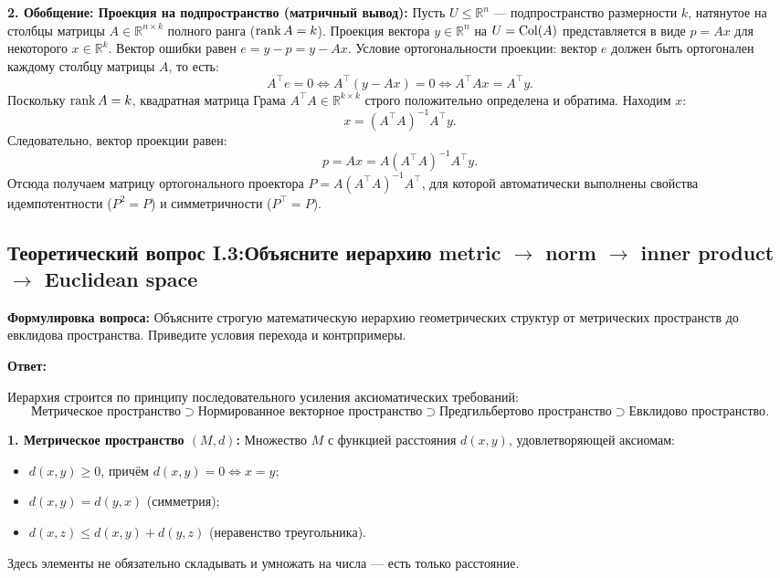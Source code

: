 \textbf{2.
Обобщение: Проекция на подпространство (матричный вывод):} Пусть $U \le \mathbb{R}^n$ — подпространство размерности $k$,
натянутое на столбцы матрицы $A \in \mathbb{R}^{n \times k}$ полного ранга ($\operatorname{rank} A = k$).
Проекция вектора $y \in \mathbb{R}^n$ на $U = \operatorname{Col}(A)$ представляется в виде $p = A x$ для некоторого $x \in
\mathbb{R}^k$.
Вектор ошибки равен $e = y - p = y - A x$.
Условие ортогональности проекции: вектор $e$ должен быть ортогонален каждому столбцу матрицы $A$, то есть:
\[ A^\top e = 0 \iff A^\top (y - A x) = 0 \iff A^\top A x = A^\top y. \]
Поскольку $\operatorname{rank} A = k$, квадратная матрица Грама $A^\top A \in \mathbb{R}^{k \times k}$ строго положительно определена
и обратима.
Находим $x$:
\[ x = (A^\top A)^{-1} A^\top y. \]
Следовательно, вектор проекции равен:
\[ p = A x = A (A^\top A)^{-1} A^\top y. \]
Отсюда получаем матрицу ортогонального проектора $P = A (A^\top A)^{-1} A^\top$, для которой автоматически выполнены
свойства идемпотентности ($P^2 = P$) и симметричности ($P^\top = P$).


\subsection{Теоретический вопрос I.3:Объясните иерархию metric $\to$ norm $\to$ inner product $\to$ Euclidean space}
\textbf{Формулировка вопроса:} Объясните строгую математическую иерархию геометрических структур от метрических
пространств до евклидова пространства.
Приведите условия перехода и контрпримеры.

\textbf{Ответ:}

Иерархия строится по принципу последовательного усиления аксиоматических требований:
\[ \text{Метрическое пространство} \supset \text{Нормированное векторное пространство} \supset
\text{Предгильбертово пространство} \supset \text{Евклидово пространство}.
\]

\textbf{1.
Метрическое пространство $(M, d)$:} Множество $M$ с функцией расстояния $d(x, y)$, удовлетворяющей аксиомам:
\begin{itemize}
    \item $d(x, y) \ge 0$, причём $d(x, y) = 0 \iff x = y$;
    \item $d(x, y) = d(y, x)$ (симметрия);
    \item $d(x, z) \le d(x, y) + d(y, z)$ (неравенство треугольника).
\end{itemize}
Здесь элементы не обязательно складывать и умножать на числа — есть только расстояние.

